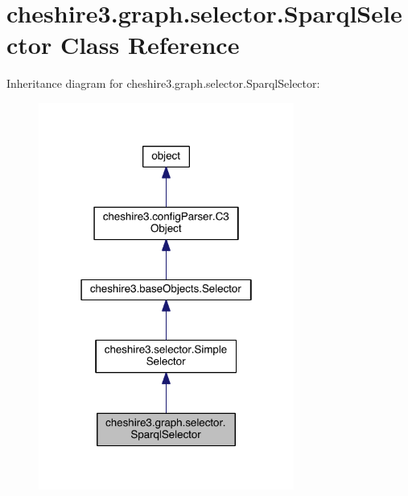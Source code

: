 \hypertarget{classcheshire3_1_1graph_1_1selector_1_1_sparql_selector}{\section{cheshire3.\-graph.\-selector.\-Sparql\-Selector Class Reference}
\label{classcheshire3_1_1graph_1_1selector_1_1_sparql_selector}
}


Inheritance diagram for cheshire3.\-graph.\-selector.\-Sparql\-Selector\-:
\nopagebreak
\begin{figure}[H]
\begin{center}
\leavevmode
\includegraphics[width=238pt]{classcheshire3_1_1graph_1_1selector_1_1_sparql_selector__inherit__graph}
\end{center}
\end{figure}



